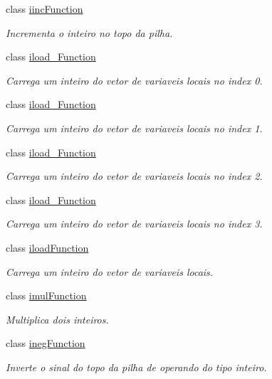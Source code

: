 \begin{DoxyCompactItemize}
class \hyperlink{classInstruction_1_1iincFunction}{iinc\+Function}
\begin{DoxyCompactList}\small\item\em Incrementa o inteiro no topo da pilha. \end{DoxyCompactList}\item 
class \hyperlink{classInstruction_1_1iload__0Function}{iload\+\_\+Function}
\begin{DoxyCompactList}\small\item\em Carrega um inteiro do vetor de variaveis locais no index 0. \end{DoxyCompactList}\item 
class \hyperlink{classInstruction_1_1iload__1Function}{iload\+\_\+Function}
\begin{DoxyCompactList}\small\item\em Carrega um inteiro do vetor de variaveis locais no index 1. \end{DoxyCompactList}\item 
class \hyperlink{classInstruction_1_1iload__2Function}{iload\+\_\+Function}
\begin{DoxyCompactList}\small\item\em Carrega um inteiro do vetor de variaveis locais no index 2. \end{DoxyCompactList}\item 
class \hyperlink{classInstruction_1_1iload__3Function}{iload\+\_\+Function}
\begin{DoxyCompactList}\small\item\em Carrega um inteiro do vetor de variaveis locais no index 3. \end{DoxyCompactList}\item 
class \hyperlink{classInstruction_1_1iloadFunction}{iload\+Function}
\begin{DoxyCompactList}\small\item\em Carrega um inteiro do vetor de variaveis locais. \end{DoxyCompactList}\item 
class \hyperlink{classInstruction_1_1imulFunction}{imul\+Function}
\begin{DoxyCompactList}\small\item\em Multiplica dois inteiros. \end{DoxyCompactList}\item 
class \hyperlink{classInstruction_1_1inegFunction}{ineg\+Function}
\begin{DoxyCompactList}\small\item\em Inverte o sinal do topo da pilha de operando do tipo inteiro. \end{DoxyCompactList}\item 

\end{DoxyCompactItemize}
